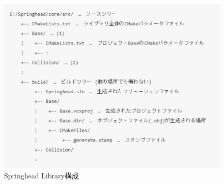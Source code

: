 \begin{narrow}
    \begin{figure}[h]
	\begin{center}
	\includegraphics[width=.9\textwidth]{fig/LibraryTree.eps}
	\end{center}
	\caption{Springhead Library構成}
	\label{fig:SpringheadLibraryTree}
    \end{figure}
\end{narrow}

